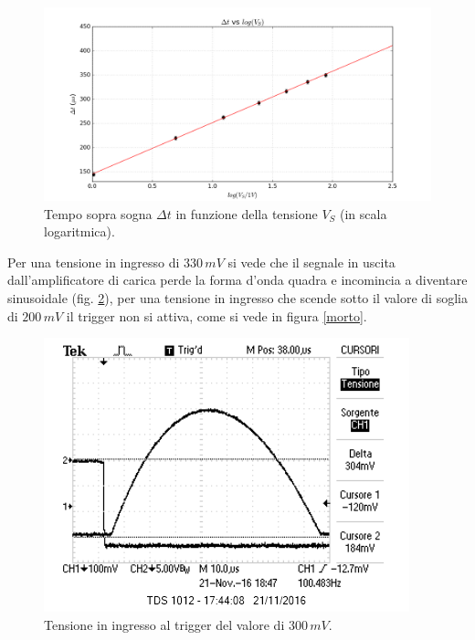 \documentclass[10pt,a4paper]{article}
\begin{document}
\begin{figure}[htb!]
\centering
\includegraphics[scale=.5]{plot.png}
\caption{Tempo sopra sogna $\Delta t$ in funzione della tensione $V_S$ (in scala logaritmica).}
\label{retta}
\end{figure}

Per una tensione in ingresso di $330 \, mV$ si vede che il segnale in uscita dall'amplificatore di carica perde la forma d'onda quadra e incomincia a diventare sinusoidale (fig. \ref{inizamorire}), per una tensione in ingresso che scende sotto il valore di soglia di $200 \, mV$ il trigger non si attiva, come si vede in figura \ref{morto}.\\

\begin{figure}[htb!]
\centering
\includegraphics[scale=1.0]{immagini/iniziaamorire.png}
\caption{Tensione in ingresso al trigger del valore di $300 \, mV$.}
\label{inizamorire}
\end{figure}
\end{document}
